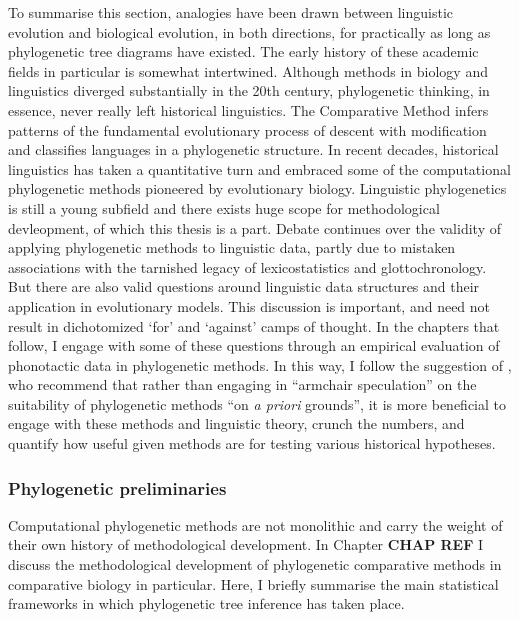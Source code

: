 To summarise this section, analogies have been drawn between linguistic evolution and biological evolution, in both directions, for practically as long as phylogenetic tree diagrams have existed. The early history of these academic fields in particular is somewhat intertwined. Although methods in biology and linguistics diverged substantially in the 20th century, phylogenetic thinking, in essence, never really left historical linguistics. The Comparative Method infers patterns of the fundamental evolutionary process of descent with modification and classifies languages in a phylogenetic structure. In recent decades, historical linguistics has taken a quantitative turn and embraced some of the computational phylogenetic methods pioneered by evolutionary biology. Linguistic phylogenetics is still a young subfield and there exists huge scope for methodological devleopment, of which this thesis is a part. Debate continues over the validity of applying phylogenetic methods to linguistic data, partly due to mistaken associations with the tarnished legacy of lexicostatistics and glottochronology. But there are also valid questions around linguistic data structures and their application in evolutionary models. This discussion is important, and need not result in dichotomized `for' and `against' camps of thought. In the chapters that follow, I engage with some of these questions through an empirical evaluation of phonotactic data in phylogenetic methods. In this way, I follow the suggestion of \textcite[p.~2299]{greenhill_does_2009}, who recommend that rather than engaging in ``armchair speculation'' on the suitability of phylogenetic methods ``on \emph{a priori} grounds'', it is more beneficial to engage with these methods and linguistic theory, crunch the numbers, and quantify how useful given methods are for testing various historical hypotheses.

\hypertarget{phylogenetic-preliminaries}{%
\subsubsection{Phylogenetic preliminaries}\label{phylogenetic-preliminaries}}

Computational phylogenetic methods are not monolithic and carry the weight of their own history of methodological development. In Chapter \textbf{CHAP REF} I discuss the methodological development of phylogenetic comparative methods in comparative biology in particular. Here, I briefly summarise the main statistical frameworks in which phylogenetic tree inference has taken place.

